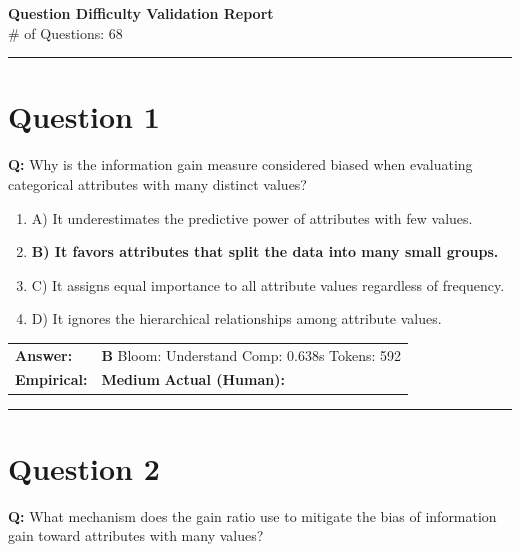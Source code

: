 \documentclass[9pt]{article}
\begin{document}
\begin{center}
{\Large \textbf{Question Difficulty Validation Report}} \\[4pt]
{\small \# of Questions: 68} \\[4pt]
\noindent\rule{\linewidth}{0.4pt}
\end{center}
\vspace{0.3cm}

\section*{Question 1}

\textbf{Q:} Why is the information gain measure considered biased when evaluating categorical attributes with many distinct values?

\begin{enumerate}[label=\textbf{\alph{*})}, nosep]
    \item A) It underestimates the predictive power of attributes with few values.
    \item \textbf{B) It favors attributes that split the data into many small groups.} %
    \item C) It assigns equal importance to all attribute values regardless of frequency.
    \item D) It ignores the hierarchical relationships among attribute values.

\end{enumerate}

\begin{tabular}{@{}l p{10.5cm}@{}}
\textbf{Answer:} & \textbf{B} \hspace{1em} Bloom: Understand \hspace{1em} Comp: 0.638s \hspace{1em} Tokens: 592 \\
\textbf{Empirical:} & \textbf{Medium} \hspace{1em} \textbf{Actual (Human):} \underline{\hspace{5cm}}
\end{tabular}

\vspace{0.2cm}
\rule{\textwidth}{0.4pt}
\vspace{0.2cm}


\section*{Question 2}

\textbf{Q:} What mechanism does the gain ratio use to mitigate the bias of information gain toward attributes with many values?
\end{document}
